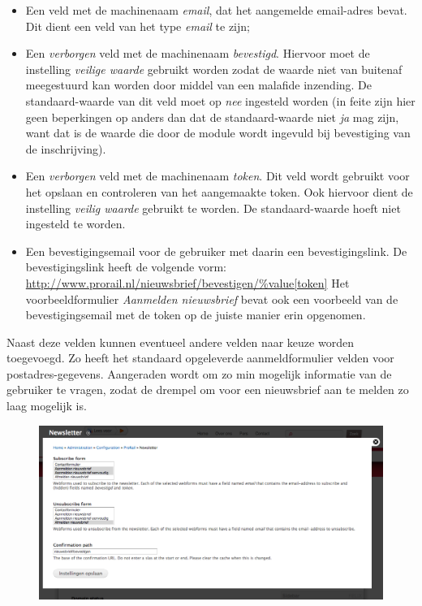 \begin{itemize}
\item Een veld met de machinenaam \emph{email}, dat het aangemelde email-adres bevat. Dit dient een veld van het type \emph{email} te zijn;
\item Een \emph{verborgen} veld met de machinenaam \emph{bevestigd}. Hiervoor moet 
de instelling \emph{veilige waarde} gebruikt worden zodat de 
waarde niet van buitenaf meegestuurd kan worden door middel van een malafide inzending. 
De standaard-waarde van dit veld moet op \emph{nee} ingesteld worden (in feite 
zijn hier geen beperkingen op anders dan dat de standaard-waarde niet \emph{ja}
mag zijn, want dat is de waarde die door de module wordt ingevuld bij bevestiging van 
de inschrijving).
\item Een \emph{verborgen} veld met de machinenaam \emph{token}. Dit veld wordt gebruikt voor het opslaan 
en controleren van het aangemaakte token. 
Ook hiervoor dient de instelling \emph{veilig waarde} gebruikt te worden. De 
standaard-waarde hoeft niet ingesteld te worden.
\item Een bevestigingsemail voor de gebruiker met daarin een bevestigingslink. De 
be\-ves\-ti\-gings\-link heeft de volgende vorm:
\url{http://www.prorail.nl/nieuwsbrief/bevestigen/\%value[token]}
Het voorbeeldformulier \emph{Aanmelden nieuwsbrief} bevat ook een voorbeeld van 
de bevestigingsemail met de token op de juiste manier erin opgenomen.
\end{itemize}

Naast deze velden kunnen eventueel andere velden naar keuze worden toegevoegd. Zo 
heeft het standaard opgeleverde aanmeldformulier velden voor postadres-gegevens. 
Aangeraden wordt om zo min mogelijk informatie van de gebruiker te vragen, zodat 
de drempel om voor een nieuwsbrief aan te melden zo laag mogelijk is.

\begin{figure}[p]
\centering
\includegraphics[width=\textwidth]{img/nieuwsbrief/nieuwsbrief_admin.png}
\end{figure}

